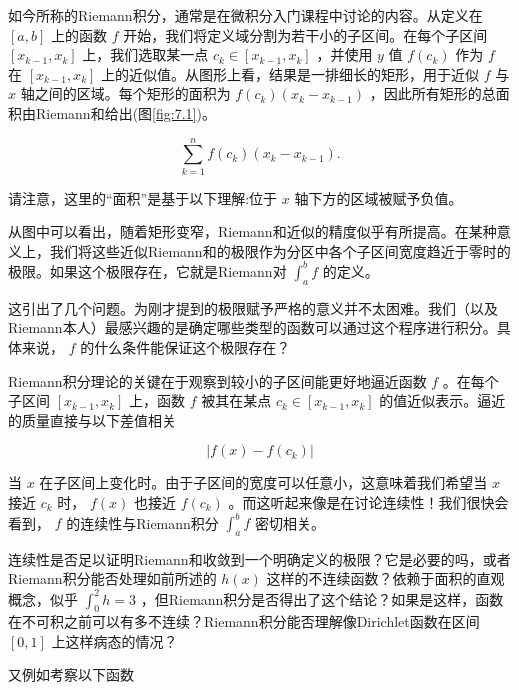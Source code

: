 如今所称的Riemann积分，通常是在微积分入门课程中讨论的内容。从定义在 \(\left\lbrack  {a,b}\right\rbrack\) 上的函数 \(f\) 开始，我们将定义域分割为若干小的子区间。在每个子区间 \(\left\lbrack  {{x}_{k - 1},{x}_{k}}\right\rbrack\) 上，我们选取某一点 \({c}_{k} \in  \left\lbrack  {{x}_{k - 1},{x}_{k}}\right\rbrack\) ，并使用 \(y\) 值 \(f\left( {c}_{k}\right)\) 作为 \(f\) 在 \(\left\lbrack  {{x}_{k - 1},{x}_{k}}\right\rbrack\) 上的近似值。从图形上看，结果是一排细长的矩形，用于近似 \(f\) 与 \(x\) 轴之间的区域。每个矩形的面积为 \(f\left( {c}_{k}\right) \left( {{x}_{k} - {x}_{k - 1}}\right)\) ，因此所有矩形的总面积由Riemann和给出(图\ref{fig:7.1})。

\[
\mathop{\sum }\limits_{{k = 1}}^{n}f\left( {c}_{k}\right) \left( {{x}_{k} - {x}_{k - 1}}\right) .
\]

请注意，这里的“面积”是基于以下理解:位于 \(x\) 轴下方的区域被赋予负值。%

从图中可以看出，随着矩形变窄，Riemann和近似的精度似乎有所提高。在某种意义上，我们将这些近似Riemann和的极限作为分区中各个子区间宽度趋近于零时的极限。如果这个极限存在，它就是Riemann对 \({\int }_{a}^{b}f\) 的定义。

这引出了几个问题。为刚才提到的极限赋予严格的意义并不太困难。我们（以及Riemann本人）最感兴趣的是确定哪些类型的函数可以通过这个程序进行积分。具体来说， \(f\) 的什么条件能保证这个极限存在？

Riemann积分理论的关键在于观察到较小的子区间能更好地逼近函数 \(f\) 。在每个子区间 \(\left\lbrack  {{x}_{k - 1},{x}_{k}}\right\rbrack\) 上，函数 \(f\) 被其在某点 \({c}_{k} \in  \left\lbrack  {{x}_{k - 1},{x}_{k}}\right\rbrack\) 的值近似表示。逼近的质量直接与以下差值相关

\[
\left| {f\left( x\right)  - f\left( {c}_{k}\right) }\right|
\]

当 \(x\) 在子区间上变化时。由于子区间的宽度可以任意小，这意味着我们希望当 \(x\) 接近 \({c}_{k}\) 时， \(f\left( x\right)\) 也接近 \(f\left( {c}_{k}\right)\) 。而这听起来像是在讨论连续性！我们很快会看到， \(f\) 的连续性与Riemann积分 \({\int }_{a}^{b}f\) 密切相关。

连续性是否足以证明Riemann和收敛到一个明确定义的极限？它是必要的吗，或者Riemann积分能否处理如前所述的 \(h\left( x\right)\) 这样的不连续函数？依赖于面积的直观概念，似乎 \({\int }_{0}^{2}h = 3\) ，但Riemann积分是否得出了这个结论？如果是这样，函数在不可积之前可以有多不连续？Riemann积分能否理解像Dirichlet函数在区间 \(\left\lbrack  {0,1}\right\rbrack\) 上这样病态的情况？

又例如考察以下函数

